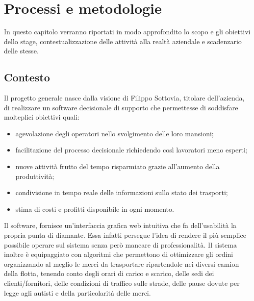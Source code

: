 
\hypertarget{(chap:capitolo2)}{}
\chapter{Processi e metodologie}
In questo capitolo verranno riportati in modo approfondito lo scopo e gli obiettivi dello stage, contestualizzazione delle attività alla realtà aziendale e scadenzario delle stesse.

\section{Contesto}
Il progetto generale nasce dalla visione di Filippo Sottovia, titolare dell'azienda, di realizzare un software decisionale di supporto che permettesse di soddisfare molteplici obiettivi quali:
\begin{itemize}
	\item agevolazione degli operatori nello svolgimento delle loro mansioni;
	\item facilitazione del processo decisionale richiedendo così lavoratori meno esperti;
	\item nuove attività frutto del tempo risparmiato grazie all'aumento della produttività;
	\item condivisione in tempo reale delle informazioni sullo stato dei trasporti;
	\item stima di costi e profitti disponibile in ogni momento.
\end{itemize}

Il software, fornisce un'interfaccia grafica web intuitiva che fa dell'usabilità la propria punta di diamante. Essa infatti persegue l'idea di rendere il più semplice possibile operare sul sistema senza però mancare di professionalità. Il sistema inoltre è equipaggiato con algoritmi che permettono di ottimizzare gli ordini organizzando al meglio le merci da trasportare ripartendole nei diversi camion della flotta, tenendo conto degli orari di carico e scarico, delle sedi dei clienti/fornitori, delle condizioni di traffico sulle strade, delle pause dovute per legge agli autisti e della particolarità delle merci.

